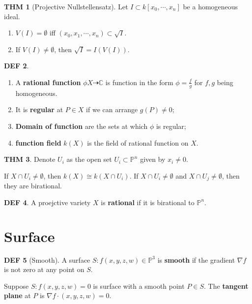 \documentclass[twocolumn]{article}
\renewcommand{\emph}[1]{{\color{blue!70!black}\sffamily\bfseries #1}}
\newcommand{\C}{\mathbb{C}}
\renewcommand{\P}{\mathbb{P}}
\theoremstyle{definition}
\newtheorem{thm}{THM}
\newtheorem{defi}[thm]{DEF}
\theoremstyle{remark}
\begin{document}
\begin{thm}[Projective Nullstellensatz]
	Let $I \subset k[x_0, \cdots, x_n]$ be a homogeneous ideal.
	\begin{enumerate}
		\item $V(I) = \emptyset$ iff $(x_0, x_1, \cdots, x_n) \subset \sqrt{I}$.
		\item  If $V(I) \neq \emptyset$, then $\sqrt{I} = I(V(I))$.
	\end{enumerate}
\end{thm}


\begin{defi}
\begin{enumerate}
	\item A \emph{rational function} $\phi X \dasharrow \C$ is function in the form $\phi = \frac{f}{g}$ for $f, g$ being homogeneous.
	\item It is \emph{regular} at $P \in X$ if we can arrange $g(P) \neq 0$;
	\item \emph{Domain of function} are the sets at which $\phi$ is regular;
	\item \emph{function field} $k(X)$ is the field of rational function on $X$.
\end{enumerate}
\end{defi}

\begin{thm}
	Denote $U_i$ as the open set $U_i \subset \P^n$ given by $x_i \neq 0$.

	If $X \cap U_i \neq \emptyset$, then $k(X) \cong k(X \cap U_i)$.
	If $X\cap U_i \neq \emptyset$ and $X \cap U_j \neq \emptyset$, then they are birational.
\end{thm}

\begin{defi}
	A proejctive variety $X$ is \emph{rational} if it is birational to $\P^n$.
\end{defi}

\section{Surface}

\begin{defi}[Smooth]
	A surface $S: f(x,y,z,w) \in \P^3$ is \emph{smooth} if the gradient $\nabla f$ is not zero at any point on $S$.
	
	Suppose $S: f(x,y,z,w) = 0$ is surface with a smooth point $P\in S$. The \emph{tangent plane} at $P$ is $\nabla f \cdot (x,y,z,w) = 0$.
\end{defi}
\end{document}
